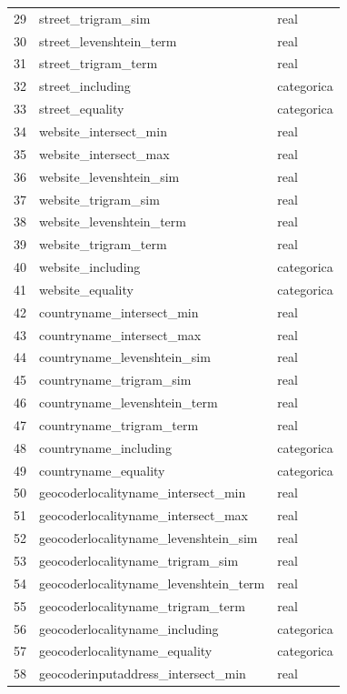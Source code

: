 \documentclass[journal]{IEEEtran}
\begin{document}
\begin{table}[ht!]
\begin{tabular}{l | l l }
29	& street\_trigram\_sim  &   real  \\
30	& street\_levenshtein\_term  &   real  \\
31	& street\_trigram\_term  &   real  \\
32	& street\_including  &    categorica   \\
33	& street\_equality  &    categorica   \\
34	& website\_intersect\_min  &   real  \\
35	& website\_intersect\_max  &   real  \\
36	& website\_levenshtein\_sim  &   real  \\
37	& website\_trigram\_sim  &   real  \\
38	& website\_levenshtein\_term  &   real  \\
39	& website\_trigram\_term  &   real  \\
40	& website\_including  &    categorica   \\
41	& website\_equality  &    categorica   \\
42	& countryname\_intersect\_min  &   real  \\
43	& countryname\_intersect\_max  &   real  \\
44	& countryname\_levenshtein\_sim  &   real  \\
45	& countryname\_trigram\_sim  &   real  \\
46	& countryname\_levenshtein\_term  &   real  \\
47	& countryname\_trigram\_term  &   real  \\
48	& countryname\_including  &    categorica   \\
49	& countryname\_equality  &    categorica   \\
50	& geocoderlocalityname\_intersect\_min  &   real  \\
51	& geocoderlocalityname\_intersect\_max  &   real  \\
52	& geocoderlocalityname\_levenshtein\_sim  &   real  \\
53	& geocoderlocalityname\_trigram\_sim  &   real  \\
54	& geocoderlocalityname\_levenshtein\_term  &   real  \\
55	& geocoderlocalityname\_trigram\_term  &   real  \\
56	& geocoderlocalityname\_including  &    categorica   \\
57	& geocoderlocalityname\_equality  &    categorica   \\
58	& geocoderinputaddress\_intersect\_min  &   real  \\

\end{tabular}
\end{table}
\end{document}
